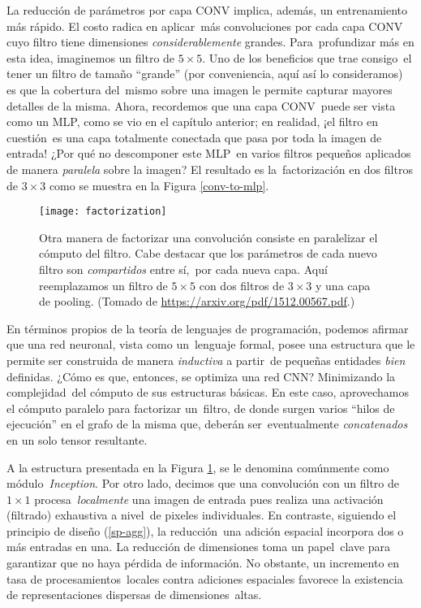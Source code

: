 La reducción de parámetros por capa CONV implica, además, un entrenamiento más rápido. El costo radica en aplicar\
más convoluciones por cada capa CONV cuyo filtro tiene dimensiones \emph{considerablemente} grandes. Para\
profundizar más en esta idea, imaginemos un filtro de $5 \times 5$. Uno de los beneficios que trae consigo\
el tener un filtro de tamaño ``grande'' (por conveniencia, aquí así lo consideramos) es que la cobertura del\
mismo sobre una imagen le permite capturar mayores detalles de la misma. Ahora, recordemos que una capa CONV\
puede ser vista como un MLP, como se vio en el capítulo anterior; en realidad, ¡el filtro en cuestión\
es una capa totalmente conectada que pasa por toda la imagen de entrada! ¿Por qué no descomponer este MLP\
en varios filtros pequeños aplicados de manera \emph{paralela} sobre la imagen? El resultado es la\
factorización en dos filtros de $3 \times 3$ como se muestra en la Figura \ref{conv-to-mlp}.\par

\begin{figure}[H]
  \centering
  \texttt{[image: factorization]}
  \caption{Otra manera de factorizar una convolución consiste en paralelizar el cómputo del filtro.
    Cabe destacar que los parámetros de cada nuevo filtro son \emph{compartidos} entre sí,\
    por cada nueva capa. Aquí reemplazamos un filtro de $5 \times 5$ con dos filtros de $3 \times 3$
    y una capa de pooling.
    (Tomado de \url{https://arxiv.org/pdf/1512.00567.pdf}.)}
  \label{factorization}
\end{figure}

En términos propios de la teoría de lenguajes de programación, podemos afirmar que una red neuronal, vista como un\
lenguaje formal, posee una estructura que le permite ser construida de manera \emph{inductiva} a partir\
de pequeñas entidades \emph{bien} definidas. ¿Cómo es que, entonces, se optimiza una red CNN? Minimizando la complejidad\
del cómputo de sus estructuras básicas. En este caso, aprovechamos el cómputo paralelo para factorizar un\
filtro, de donde surgen varios ``hilos de ejecución'' en el grafo de la misma que, deberán ser\
eventualmente \emph{concatenados} en un solo tensor resultante.\par
A la estructura presentada en la Figura \ref{factorization}, se le denomina comúnmente como módulo\
\emph{Inception}. Por otro lado, decimos que una convolución con un filtro de $1 \times 1$ procesa\
\emph{localmente} una imagen de entrada pues realiza una activación (filtrado) exhaustiva a nivel\
de pixeles individuales. En contraste, siguiendo el principio de diseño (\ref{sp-agg}), la reducción\
una adición espacial incorpora dos o más entradas en una. La reducción de dimensiones toma un papel\
clave para garantizar que no haya pérdida de información. No obstante, un incremento en tasa de procesamientos\
locales contra adiciones espaciales favorece la existencia de representaciones dispersas de dimensiones\
altas.

